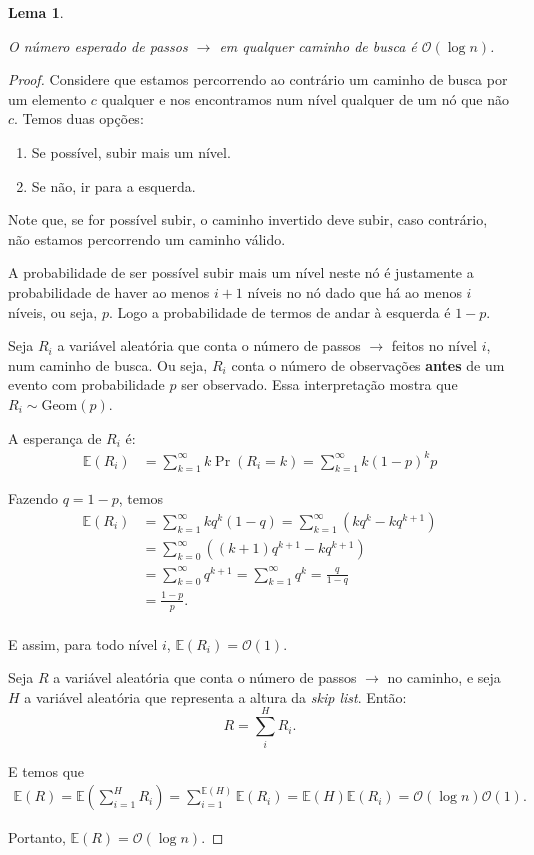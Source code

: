 \documentclass[paper=a4, fontsize=11pt]{scrartcl} %
\newtheorem{lemma}[theorem]{Lema}
\numberwithin{equation}{section}
\numberwithin{figure}{section}
\numberwithin{table}{section}
\numberwithin{definition}{section}
\numberwithin{theorem}{section}
\numberwithin{property}{section}
\numberwithin{proposition}{section}
\newcommand{\cO}{\ensuremath{\mathcal{O}}}
\newcommand{\skl}{\textit{skip list}\xspace}
\newcommand{\Exp}{\ensuremath{{\mathbb{E}}}\xspace}
\begin{document}
\begin{lemma} \label{lemma:rightarrow}

O número esperado de passos $\rightarrow$ em qualquer caminho de busca é $\cO(\log n)$.

\end{lemma}

\begin{proof}
Considere que estamos percorrendo ao contrário um caminho de busca por um elemento $c$ qualquer 
e nos encontramos num nível qualquer de um nó que não $c$. Temos duas opções:
\begin{enumerate}[noitemsep]
  \item Se possível, subir mais um nível. 
  \item Se não, ir para a esquerda.
\end{enumerate}

Note que, se for possível subir, o caminho invertido deve subir, caso contrário, não estamos percorrendo um 
caminho válido.

A probabilidade de ser possível subir mais um nível neste nó é justamente a probabilidade de haver ao menos
$i + 1$ níveis no nó dado que há ao menos $i$ níveis, ou seja, $p$. Logo a probabilidade de termos de andar à
esquerda é $1 - p$.

Seja $R_i$ a variável aleatória que conta o número de passos $\rightarrow$ feitos no nível $i$, num 
caminho de busca. Ou seja, $R_i$ conta o número de observações \textbf{antes} de um evento com probabilidade 
$p$ ser observado. Essa interpretação mostra que $R_i \sim \text{Geom}(p)$. 

A esperança de $R_i$ é:
\begin{align*}
\Exp(R_i)
  &= \sum_{k = 1}^{\infty} k \Pr(R_i = k)= \sum_{k = 1}^{\infty} k (1 - p)^{k} p 
\end{align*}

Fazendo  $q = 1 - p$, temos
\begin{align*}
\Exp(R_i)
  &= \sum_{k = 1}^{\infty} k q^{k} (1 - q) 
    = \sum_{k = 1}^{\infty} \left( k q^{k}  - k q^{k+1} \right)  \\
  &= \sum_{k = 0}^{\infty} \left( (k+1) q^{k+1}  - k q^{k+1} \right) \\
  &= \sum_{k = 0}^{\infty} q^{k+1} 
    = \sum_{k = 1}^{\infty} q^{k}  
    = \frac{q}{1-q} \\
  &= \frac{1 - p}{p}. \\
\end{align*}

E assim, para todo nível $i$, $\Exp(R_i) = \cO(1)$.

Seja $R$ a variável aleatória que conta o número de passos $\rightarrow$ no caminho, 
e seja $H$ a variável aleatória que representa a altura da \skl. Então:
$$
R = \sum_i^H R_i.
$$

E temos que
\begin{align*}
\Exp(R) = \Exp \left( \sum_{i=1}^H R_i \right) = \sum_{i=1}^{\Exp(H)} \Exp(R_i)
 =  \Exp(H) \Exp(R_i) = \cO(\log n) \cO(1).
\end{align*}

Portanto, $\Exp(R) = \cO(\log n).$

\end{proof}
\end{document}
